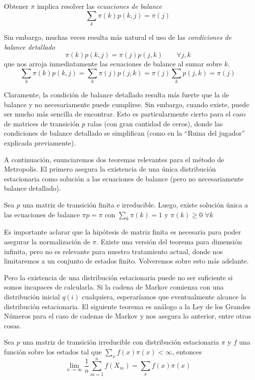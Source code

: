 Obtener $\pi$ implica resolver las \textit{ecuaciones de balance}
\[ \sum_k \pi(k) p(k, j) = \pi(j) \]

Sin embargo, muchas veces resulta más natural el uso de las \textit{condiciones de balance detallado}
\[ \pi(k) p(k, j) = \pi(j)p(j, k) \qquad \forall j,k \]
que nos arroja inmediatamente las ecuaciones de balance al sumar sobre $k$.
\[ \sum_k \pi(k) p(k, j) = \sum_k \pi(j)p(j, k) = \pi(j) \sum_k p(j,k) = \pi(j) \]

Claramente, la condición de balance detallado resulta más fuerte que la de balance y no necesariamente puede cumplirse.
Sin embargo, cuando existe, puede ser mucho más sencilla de encontrar.
Esto es particularmente cierto para el caso de matrices de transición $p$ ralas (con gran cantidad de ceros), donde las condiciones de balance detallado se simplifican (como en la ``Ruina del jugador'' explicada previamente).

A continuación, enunciaremos dos teoremas relevantes para el método de Metropolis\cite[pp. 26]{BOOK:DURRET}.
El primero asegura la existencia de una única distribución estacionaria como solución a las ecuaciones de balance (pero no necesariamente balance detallado).

\begin{theorem}
 Sea $p$ una matriz de transición finita e irreducible. Luego, existe solución única a las ecuaciones de balance $\pi p = \pi$ con $\sum_k \pi(k) = 1$ y $\pi(k)\geq 0$ $\forall k$
\end{theorem}

Es importante aclarar que la hipótesis de matriz finita es necesaria para poder asegurar la normalización de $\pi$.
Existe una versión del teorema para dimensión infinita, pero no es relevante para nuestro tratamiento actual, donde nos limitaremos a un conjunto de estados finito.
Volveremos sobre esto más adelante.

Pero la existencia de una distribución estacionaria puede no ser suficiente si somos incapaces de calcularla.
Si la cadena de Markov comienza con una distribución inicial $q(i)$ cualquiera, esperaríamos que eventualmente alcance la distribución estacionaria.
El siguiente teorema es análogo a la Ley de los Grandes Números para el caso de cadenas de Markov y nos asegura lo anterior, entre otras cosas.

\begin{theorem}{\label{teo:markov_muestreo}}
 Sea $p$ una matriz de transición irreducible con distribución estacionaria $\pi$ y $f$ una función sobre los estados tal que $\sum_x f(x)\pi(x) < \infty$, entonces
 \[ \lim_{n\to\infty} \frac{1}{n} \sum_{m=1}^n f(X_m) = \sum_x f(x)\pi(x) \]
\end{theorem}

